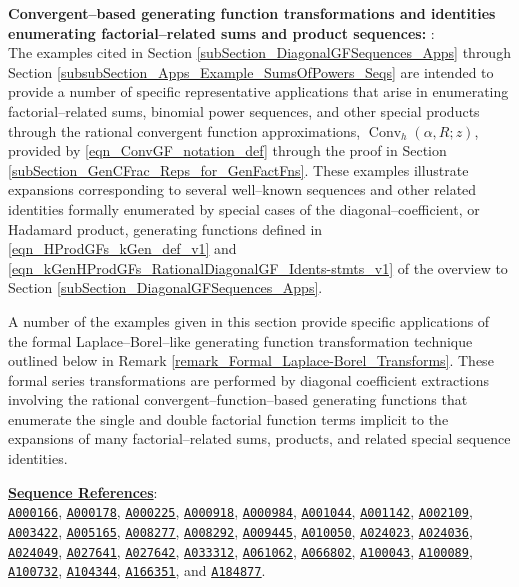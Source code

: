 \documentclass[12pt,reqno]{article}
\numberwithin{sfootnote}{section}
\numberwithin{equation}{section}
\newcommand{\itemlabel}[1]{\textbf{#1}: \\ }
\theoremstyle{DefaultTheoremStyle}
\theoremstyle{definition}
\newcommand{\seqnum}[1]{\href{http://oeis.org/#1}{\texttt{\underline{#1}}}}
\newcommand{\ConvGF}[4]{\ensuremath{\Conv_{#1}\left(#2, #3; #4\right)}}
\DeclareMathOperator{\Conv}{Conv}
\begin{document}
\begin{enumerate}[leftmargin=\parindent,itemsep=-1mm]
\begin{enumerate}[leftmargin=\parindent]
\itemlabel{Convergent--based generating function transformations and 
           identities enumerating factorial--related sums and 
           product sequences:
           \sectionpageref{subSection_DiagonalGFSequences_Apps}} 
The examples cited in 
Section \ref{subSection_DiagonalGFSequences_Apps} through 
Section \ref{subsubSection_Apps_Example_SumsOfPowers_Seqs} 
are intended to provide a number of 
specific representative applications that arise in 
enumerating factorial--related sums, 
binomial power sequences, and other special products through the 
rational convergent function approximations, $\ConvGF{h}{\alpha}{R}{z}$, 
provided by \eqref{eqn_ConvGF_notation_def} through the proof in 
Section \ref{subSection_GenCFrac_Reps_for_GenFactFns}. 
These examples illustrate expansions 
corresponding to several well--known sequences and other related identities 
formally enumerated by special cases of the 
diagonal--coefficient, or Hadamard product, generating functions defined in 
\eqref{eqn_HProdGFs_kGen_def_v1} and 
\eqref{eqn_kGenHProdGFs_RationalDiagonalGF_Idents-stmts_v1} 
of the overview to 
Section \ref{subSection_DiagonalGFSequences_Apps}. 

A number of the examples given in this section provide 
specific applications of the formal Laplace--Borel--like 
generating function transformation technique outlined below in 
Remark \ref{remark_Formal_Laplace-Borel_Transforms}. 
These formal series transformations are 
performed by diagonal coefficient extractions 
involving the rational convergent--function--based 
generating functions that enumerate the single and double 
factorial function terms implicit to the expansions of many 
factorial--related sums, products, and related 
special sequence identities. 

{ 
     \smaller\noindent 
     \textbf{\underline{Sequence References}}: \\ 
     \seqnum{A000166}, \seqnum{A000178}, \seqnum{A000225}, \seqnum{A000918}, 
     \seqnum{A000984}, \seqnum{A001044}, \seqnum{A001142}, 
     \seqnum{A002109}, \seqnum{A003422}, 
     \seqnum{A005165}, \seqnum{A008277}, \seqnum{A008292}, \seqnum{A009445}, 
     \seqnum{A010050}, \seqnum{A024023}, \seqnum{A024036}, \seqnum{A024049}, 
     \seqnum{A027641}, \seqnum{A027642}, \seqnum{A033312}, \seqnum{A061062}, 
     \seqnum{A066802}, \seqnum{A100043}, \seqnum{A100089}, \seqnum{A100732}, 
     \seqnum{A104344}, \seqnum{A166351}, and \seqnum{A184877}. 

} 

\end{enumerate} 


\end{enumerate}
\end{document}
